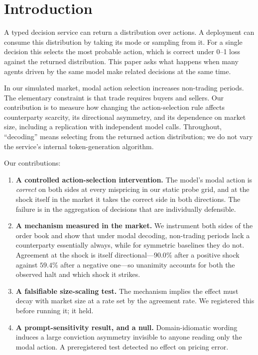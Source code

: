 \documentclass[11pt]{article}
\begin{document}
\section{Introduction}

A typed decision service can return a distribution over actions. A deployment
can consume this distribution by taking its mode or sampling from it.
For a single decision this selects the most probable action, which is correct
under 0--1 loss against the returned distribution. This paper
asks what happens when many agents driven by the same model make related
decisions at the same time.

In our simulated market, modal action selection increases non-trading periods.
The elementary constraint is that trade requires buyers and sellers. Our
contribution is to measure how changing the action-selection rule affects
counterparty scarcity, its directional asymmetry, and its dependence on market
size, including a replication with independent model calls. Throughout,
``decoding'' means selecting from the returned action distribution; we do not
vary the service's internal token-generation algorithm.

Our contributions:

\begin{enumerate}
\item \textbf{A controlled action-selection intervention.} The
  model's modal action is \emph{correct} on both sides at every mispricing in
  our static probe grid, and at the shock itself in the market it takes the
  correct side in both directions. The failure is in the aggregation of
  decisions that are individually defensible.
\item \textbf{A mechanism measured in the market.} We instrument both sides of
  the order book and show that under modal decoding, non-trading periods lack a
  counterparty essentially always, while for symmetric baselines they do not.
  Agreement at the shock is itself directional---$90.0\%$ after a positive
  shock against $59.4\%$ after a negative one---so unanimity accounts for both
  the observed halt and which shock it strikes.
\item \textbf{A falsifiable size-scaling test.} The mechanism implies the
  effect must decay with market size at a rate set by the agreement rate. We
  registered this before running it; it held.
\item \textbf{A prompt-sensitivity result, and a null.} Domain-idiomatic
  wording induces a large conviction asymmetry invisible to anyone reading only
  the modal action. A preregistered test detected no effect on pricing error.
\end{enumerate}
\end{document}
